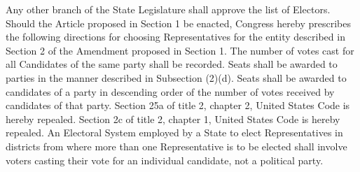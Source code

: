 \documentclass{article}
\begin{document}
    Any other branch of the State Legislature shall approve the list of Electors.
    Should the Article proposed in Section 1 be enacted, Congress hereby prescribes the following directions for choosing Representatives for the entity described in Section 2 of the Amendment proposed in Section 1. 
    The number of votes cast for all Candidates of the same party shall be recorded.
    Seats shall be awarded to parties in the manner described in Subsection (2)(d).
    Seats shall be awarded to candidates of a party in descending order of the number of votes received by candidates of that party. 
    Section 25a of title 2, chapter 2, United States Code is hereby repealed.
    Section 2c of title 2, chapter 1, United States Code is hereby repealed.
    An Electoral System employed by a State to elect Representatives in districts from where more than one Representative is to be elected shall involve voters casting their vote for an individual candidate, not a political party.
\end{document}
